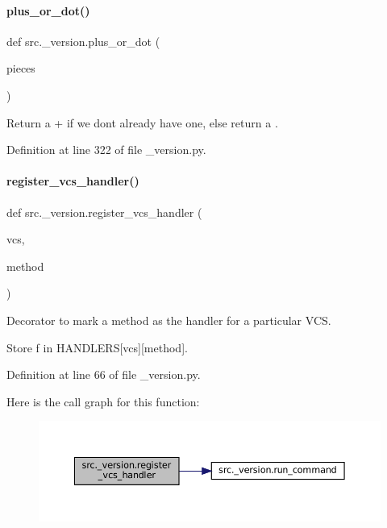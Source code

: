 \paragraph{\texorpdfstring{plus\+\_\+or\+\_\+dot()}{plus\_or\_dot()}}
{\footnotesize\ttfamily def src.\+\_\+version.\+plus\+\_\+or\+\_\+dot (\begin{DoxyParamCaption}\item[{}]{pieces }\end{DoxyParamCaption})}



Return a + if we don\textquotesingle{}t already have one, else return a . 



Definition at line 322 of file \+\_\+version.\+py.

\mbox{\label{namespacesrc_1_1__version_a0477040e1e7a9284f041925048d8757d}} 
\paragraph{\texorpdfstring{register\+\_\+vcs\+\_\+handler()}{register\_vcs\_handler()}}
{\footnotesize\ttfamily def src.\+\_\+version.\+register\+\_\+vcs\+\_\+handler (\begin{DoxyParamCaption}\item[{}]{vcs,  }\item[{}]{method }\end{DoxyParamCaption})}



Decorator to mark a method as the handler for a particular V\+CS. 

Store f in H\+A\+N\+D\+L\+E\+RS\mbox{[}vcs\mbox{]}\mbox{[}method\mbox{]}. 

Definition at line 66 of file \+\_\+version.\+py.

Here is the call graph for this function\+:
\nopagebreak
\begin{figure}[H]
\begin{center}
\leavevmode
\includegraphics[width=350pt]{namespacesrc_1_1__version_a0477040e1e7a9284f041925048d8757d_cgraph}
\end{center}
\end{figure}
\mbox{\label{namespacesrc_1_1__version_a993e064384f8f9986d0ef6f48f7e967c}} 
